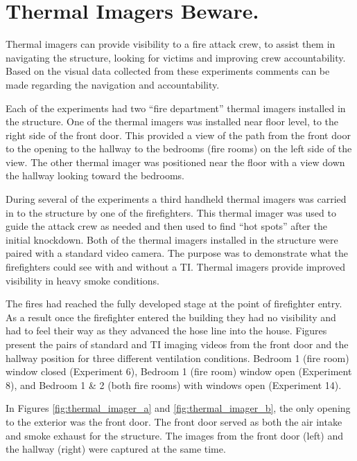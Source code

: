 \documentclass[12pt,oneside]{book}
\begin{document}
\section{Thermal Imagers Beware.} \label{tc:thermal_imagers_beware}
Thermal imagers can provide visibility to a fire attack crew, to assist them in navigating the structure, looking for victims and improving crew accountability.  Based on the visual data collected from these experiments comments can be made regarding the navigation and accountability.   

Each of the experiments had two “fire department” thermal imagers installed in the structure.  One of the thermal imagers was installed near floor level, to the right side of the front door.  This provided a view of the path from the front door to the opening to the hallway to the bedrooms (fire rooms) on the left side of the view.  The other thermal imager was positioned near the floor with a view down the hallway looking toward the bedrooms.  

During several of the experiments a third handheld thermal imagers was carried in to the structure by one of the firefighters.  This thermal imager was used to guide the attack crew as needed and then used to find “hot spots” after the initial knockdown.  
Both of the thermal imagers installed in the structure were paired with a standard video camera.  The purpose was to demonstrate what the firefighters could see with and without a TI.  
Thermal imagers provide improved visibility in heavy smoke conditions.

The fires had reached the fully developed stage at the point of firefighter entry.  As a result once the firefighter entered the building they had no visibility and had to feel their way as they advanced the hose line into the house.   Figures present the pairs of standard and TI imaging videos from the front door and the hallway position for three different ventilation conditions.  Bedroom 1 (fire room) window closed (Experiment 6), Bedroom 1 (fire room) window open (Experiment 8), and Bedroom 1 \& 2 (both fire rooms) with windows open (Experiment 14).  

In Figures \ref{fig:thermal_imager_a} and \ref{fig:thermal_imager_b}, the only opening to the exterior was the front door.  The front door served as both the air intake and smoke exhaust for the structure.  The images from the front door (left) and the hallway (right) were captured at the same time.    
\end{document}
